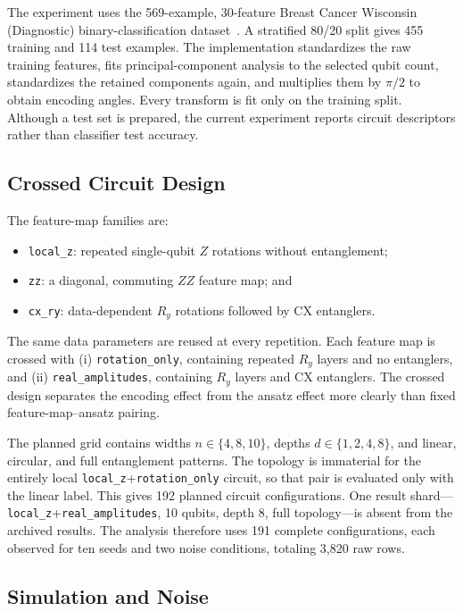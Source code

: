 \documentclass[conference]{IEEEtran}
\begin{document}
The experiment uses the 569-example, 30-feature Breast Cancer Wisconsin
(Diagnostic) binary-classification dataset~\cite{uciWDBC}.  A stratified
80/20 split gives 455 training and 114 test examples.  The implementation
standardizes the raw training features, fits principal-component analysis
to the selected qubit count, standardizes the retained components again,
and multiplies them by $\pi/2$ to obtain encoding angles.  Every transform
is fit only on the training split.  Although a test set is prepared, the
current experiment reports circuit descriptors rather than classifier test
accuracy.

\subsection{Crossed Circuit Design}

The feature-map families are:
\begin{itemize}
  \item \texttt{local\_z}: repeated single-qubit $Z$ rotations without
  entanglement;
  \item \texttt{zz}: a diagonal, commuting $ZZ$ feature map; and
  \item \texttt{cx\_ry}: data-dependent $R_y$ rotations followed by CX
  entanglers.
\end{itemize}
The same data parameters are reused at every repetition.  Each feature map
is crossed with (i) \texttt{rotation\_only}, containing repeated $R_y$
layers and no entanglers, and (ii) \texttt{real\_amplitudes}, containing
$R_y$ layers and CX entanglers.  The crossed design separates the encoding
effect from the ansatz effect more clearly than fixed feature-map--ansatz
pairing.

The planned grid contains widths $n\in\{4,8,10\}$, depths
$d\in\{1,2,4,8\}$, and linear, circular, and full entanglement patterns.
The topology is immaterial for the entirely local
\texttt{local\_z}+\texttt{rotation\_only} circuit, so that pair is evaluated
only with the linear label.  This gives 192 planned circuit configurations.
One result shard---\texttt{local\_z}+\texttt{real\_amplitudes}, 10 qubits,
depth 8, full topology---is absent from the archived results.  The analysis
therefore uses 191 complete configurations, each observed for ten seeds and
two noise conditions, totaling 3,820 raw rows.

\subsection{Simulation and Noise}
\end{document}
